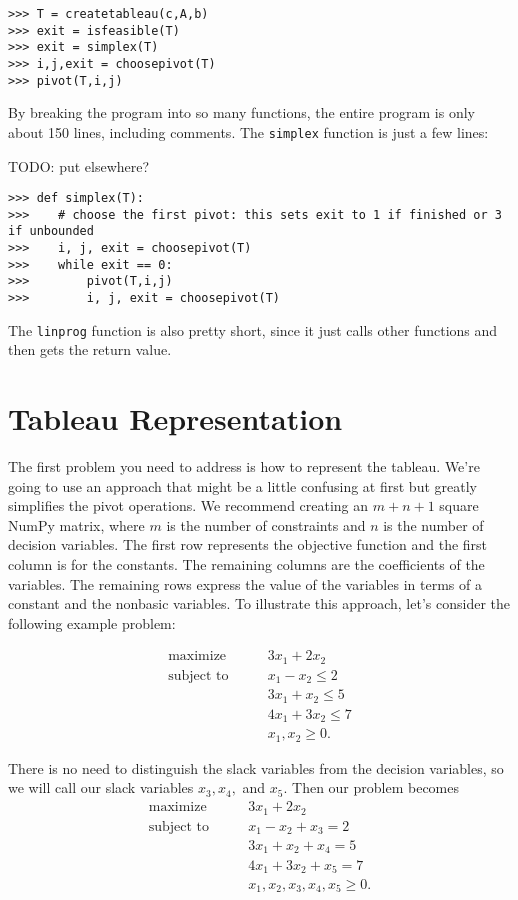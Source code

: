 \begin{lstlisting}
>>> T = createtableau(c,A,b)
>>> exit = isfeasible(T)
>>> exit = simplex(T)
>>> i,j,exit = choosepivot(T)
>>> pivot(T,i,j)
\end{lstlisting}

By breaking the program into so many functions, the entire program is only about 150 lines, including comments.
The {\tt simplex} function is just a few lines:

TODO: put elsewhere?

\begin{lstlisting}
>>> def simplex(T):
>>>    # choose the first pivot: this sets exit to 1 if finished or 3 if unbounded
>>>    i, j, exit = choosepivot(T)
>>>    while exit == 0:
>>>        pivot(T,i,j)
>>>        i, j, exit = choosepivot(T)
\end{lstlisting}
The {\tt linprog} function is also pretty short, since it just calls other functions and then gets the return value.

\section*{Tableau Representation}

The first problem you need to address is how to represent the tableau.
We're going to use an approach that might be a little confusing at first but greatly simplifies the pivot operations.
We recommend creating an $m + n + 1$ square NumPy matrix, where $m$ is the number of constraints and $n$ is the number of decision variables.
The first row represents the objective function and the first column is for the constants.
The remaining columns are the coefficients of the variables.
The remaining rows express the value of the variables in terms of a constant and the nonbasic variables.
To illustrate this approach, let's consider the following example problem:

\begin{align*}
	\mbox{maximize}\qquad
        &    3x_1 + 2x_2 \\
	\mbox{subject to}\qquad
        &     x_1 - x_2 \leq 2 \\
		&	 3x_1 + x_2 \leq 5 \\
		&	 4x_1 + 3x_2 \leq 7 \\
		&     x_1, x_2 \geq 0.
\end{align*}

There is no need to distinguish the slack variables from the decision variables, so we will call our slack variables $x_3, x_4,$ and $x_5$.
Then our problem becomes
\begin{align*}
	\mbox{maximize}\qquad
        &    3x_1 + 2x_2 \\
	\mbox{subject to}\qquad
        &     x_1 - x_2 + x_3 = 2 \\
		&	 3x_1 + x_2 + x_4 = 5 \\
		&	 4x_1 + 3x_2 + x_5 = 7 \\
		&     x_1, x_2, x_3, x_4, x_5 \geq 0.
\end{align*}

